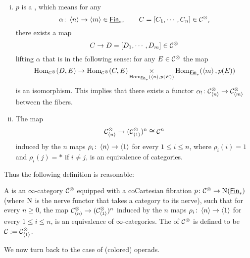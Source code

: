 \documentclass[twoside]{article}
\begin{document}
\begin{proposition}
    \begin{enumerate}[i)]
        \item $p$ is a , which means for any 
        \[\alpha\colon\left<n\right>\to\left<m\right>\in\underline{\smash{\mathsf{Fin}}}_*,\hspace{2em}C=[C_1,\cdots,C_n]\in\cal C^\otimes,\]
        there exists a map \[C\to D=[D_1,\cdots,D_m]\in\cal C^\otimes\] lifting $\alpha$
        that is  in the following sense: for any $E\in\cal C^\otimes$
        the map \[\operatorname{Hom}_{\cal C^\otimes}(D,E)\to\operatorname{Hom}_{\cal C^\otimes}(C,E)
        \mathop{\operatorname{\times}}\limits_{\operatorname{Hom}_{\underline{\smash{\mathsf{Fin}}}_*}(\left<n\right>,p(E))}
        \operatorname{Hom}_{\underline{\smash{\mathsf{Fin}}}_*}(\left<m\right>,p(E))\] is an isomorphism. This implies that there exists
        a functor $\alpha_!\colon\mathcal C^\otimes_{\left<n\right>}\to\mathcal C^\otimes_{\left<m\right>}$
        between the fibers.
    
        \item The map \[\mathcal C^\otimes_{\left<n\right>}\to(\mathcal C^\otimes_{\left<1\right>})^n\cong {\cal C}^n\] induced by
        the $n$ maps $\rho_i\colon\left<n\right>\to\left<1\right>$ for every $1\le i\le n$, where $\rho_i(i)=1$
        and $\rho_i(j)=*$ if $i\ne j$, is an equivalence of categories.
    \end{enumerate}
\end{proposition}

Thus the following definition is reasonable:

\begin{definition}
    A  is an $\infty$-category 
    $\cal C^\otimes$ equipped with a coCartesian fibration $p\colon\cal C^\otimes\to\mathrm{N}(\underline{\smash{\mathsf{Fin}}}_*)$
    (where $\mathrm{N}$ is the nerve functor that takes a category to its nerve),
    such that for every $n\ge 0$, the map $\mathcal C^\otimes_{\left<n\right>}
    \to(\mathcal C^\otimes_{\left<1\right>})^n$ induced by the $n$ maps $\rho_i\colon\left<n\right>\to\left<1\right>$
    for every $1\le i\le n$, is an equivalence of $\infty$-categories.
    The  of $\cal C^\otimes$
    is defined to be $\mathcal C:=\mathcal C^\otimes_{\left<1\right>}$.
\end{definition}

We now turn back to the case of (colored) operads. 
\end{document}
